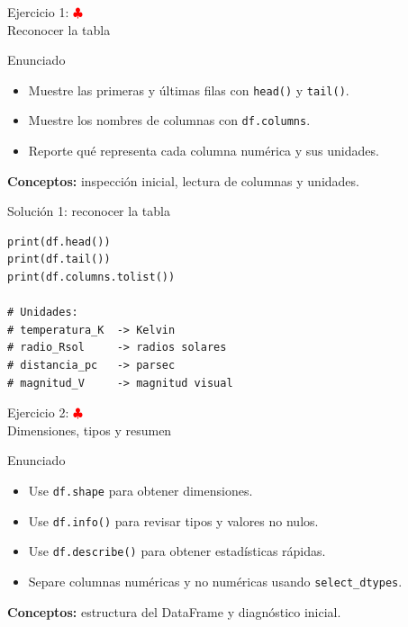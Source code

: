 \documentclass[10pt]{beamer}
\begin{document}
\begin{frame}{Ejercicio 1: \hfill \textcolor{red}{$\clubsuit$} \\ Reconocer la tabla}
  \begin{block}{Enunciado}
    \begin{itemize}
      \item Muestre las primeras y últimas filas con \texttt{head()} y \texttt{tail()}.
      \item Muestre los nombres de columnas con \texttt{df.columns}.
      \item Reporte qué representa cada columna numérica y sus unidades.
    \end{itemize}
  \end{block}
  \textbf{Conceptos:} inspección inicial, lectura de columnas y unidades.
\end{frame}

\begin{solutionblock}
\begin{frame}[fragile]{Solución 1: reconocer la tabla}
\begin{verbatim}
print(df.head())
print(df.tail())
print(df.columns.tolist())

# Unidades:
# temperatura_K  -> Kelvin
# radio_Rsol     -> radios solares
# distancia_pc   -> parsec
# magnitud_V     -> magnitud visual
\end{verbatim}
\end{frame}
\end{solutionblock}

\begin{frame}{Ejercicio 2: \hfill \textcolor{red}{$\clubsuit$} \\ Dimensiones, tipos y resumen}
  \begin{block}{Enunciado}
    \begin{itemize}
      \item Use \texttt{df.shape} para obtener dimensiones.
      \item Use \texttt{df.info()} para revisar tipos y valores no nulos.
      \item Use \texttt{df.describe()} para obtener estadísticas rápidas.
      \item Separe columnas numéricas y no numéricas usando \texttt{select\_dtypes}.
    \end{itemize}
  \end{block}
  \textbf{Conceptos:} estructura del DataFrame y diagnóstico inicial.
\end{frame}
\end{document}
